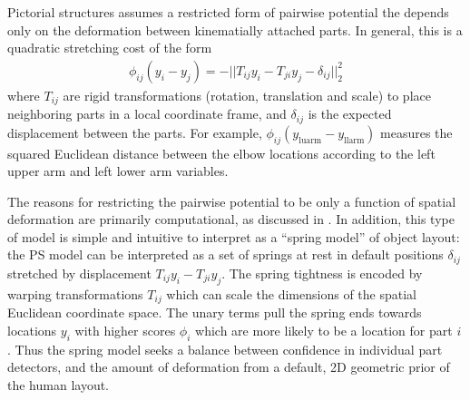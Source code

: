  Pictorial structures assumes a restricted form of 
pairwise potential the depends only on the deformation between kinematially 
attached parts. In general, this is a quadratic stretching cost of the form 
\begin{align} \label{eq:springcost}
\phi_{ij}(y_i-y_j) = -||T_{ij} y_i - T_{ji} y_j - \delta_{ij} ||_2^2 
\end{align}
where $T_{ij}$ are rigid transformations (rotation, translation and scale) to 
place neighboring parts in a local coordinate frame, and $\delta_{ij}$ is the 
expected displacement between the parts.  For example, 
$\phi_{ij}(y_{\text{luarm}} - y_{\text{llarm}})$ measures the squared Euclidean 
distance between the elbow locations according to the left upper arm and left 
lower arm variables.  

 The reasons for restricting the pairwise 
potential to be only a function of spatial deformation are primarily 
computational, as discussed in .  In addition, this type of model is 
simple and intuitive to interpret as a ``spring model'' of object layout: the 
PS model can be interpreted as a set of springs at rest in default positions 
$\delta_{ij}$ stretched by displacement $T_{ij} y_i - T_{ji}y_j $.  The spring 
tightness is encoded by warping transformations $T_{ij}$ which can scale the 
dimensions of the spatial Euclidean coordinate space.  The unary terms pull the 
spring ends towards locations $y_i$ with higher scores $\phi_i$ which are more 
likely to be a location for part $i$.  Thus the spring model seeks a balance 
between confidence in individual part detectors, and the amount of deformation 
from a default, 2D geometric prior of the human layout.

